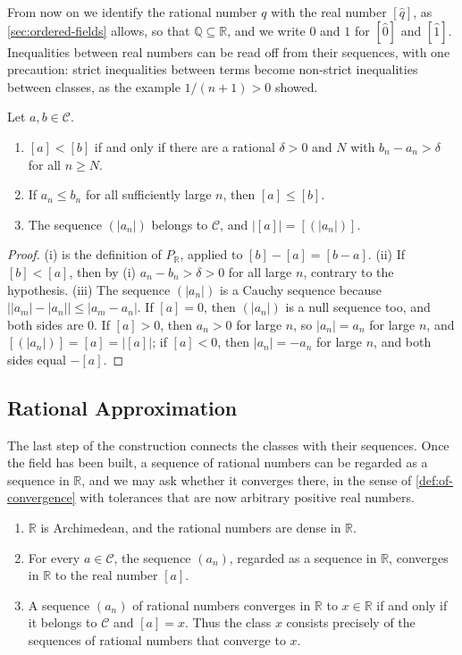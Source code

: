 From now on we identify the rational number $q$ with the real number $[\hat q]$, as \cref{sec:ordered-fields} allows, so that $\mathbb Q\subseteq\mathbb R$, and we write $0$ and $1$ for $[\hat0]$ and $[\hat1]$. Inequalities between real numbers can be read off from their sequences, with one precaution: strict inequalities between terms become non-strict inequalities between classes, as the example $1/(n+1)>0$ showed.

\begin{lemma}
\label{lem:termwise-order}
Let $a,b\in\mathcal C$.
\begin{enumerate}
\item $[a]<[b]$ if and only if there are a rational $\delta>0$ and $N$ with $b_n-a_n>\delta$ for all $n\ge N$.
\item If $a_n\le b_n$ for all sufficiently large $n$, then $[a]\le[b]$.
\item The sequence $(|a_n|)$ belongs to $\mathcal C$, and $\bigl|[a]\bigr|=[(|a_n|)]$.
\end{enumerate}
\end{lemma}

\begin{proof}
(i) is the definition of $P_{\mathbb R}$, applied to $[b]-[a]=[b-a]$. (ii) If $[b]<[a]$, then by (i) $a_n-b_n>\delta>0$ for all large $n$, contrary to the hypothesis. (iii) The sequence $(|a_n|)$ is a Cauchy sequence because $\bigl||a_m|-|a_n|\bigr|\le|a_m-a_n|$. If $[a]=0$, then $(|a_n|)$ is a null sequence too, and both sides are $0$. If $[a]>0$, then $a_n>0$ for large $n$, so $|a_n|=a_n$ for large $n$, and $[(|a_n|)]=[a]=\bigl|[a]\bigr|$; if $[a]<0$, then $|a_n|=-a_n$ for large $n$, and both sides equal $-[a]$.
\end{proof}

\subsection{Rational Approximation}

The last step of the construction connects the classes with their sequences. Once the field has been built, a sequence of rational numbers can be regarded as a sequence in $\mathbb R$, and we may ask whether it converges there, in the sense of \cref{def:of-convergence} with tolerances that are now arbitrary positive real numbers.

\begin{theorem}
\label{thm:r-archimedean}
\leavevmode
\begin{enumerate}
\item $\mathbb R$ is Archimedean, and the rational numbers are dense in $\mathbb R$.
\item For every $a\in\mathcal C$, the sequence $(a_n)$, regarded as a sequence in $\mathbb R$, converges in $\mathbb R$ to the real number $[a]$.
\item A sequence $(a_n)$ of rational numbers converges in $\mathbb R$ to $x\in\mathbb R$ if and only if it belongs to $\mathcal C$ and $[a]=x$. Thus the class $x$ consists precisely of the sequences of rational numbers that converge to $x$.
\end{enumerate}
\end{theorem}

